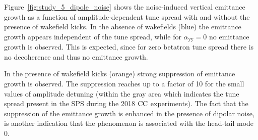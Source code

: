 Figure~\ref{fig:study_5_dipole_noise} shows the noise-induced vertical emittance growth as a function of amplitude-dependent tune spread with and without the presence of wakefield kicks. In the absence of wakefields (blue) the emittance growth appears independent of the tune spread, while for $\alpha_\mathrm{yy}=0$ no emittance growth is observed. This is expected, since for zero betatron tune spread there is no decoherence and thus no emittance growth.
 




In the presence of wakefield kicks (orange) strong suppression of emittance growth is observed. The suppression reaches up to a factor of 10 for the small values of amplitude detuning (within the gray area which indicates the tune spread present in the SPS during the 2018 ${\mathrm{CC}}$ experiments). The fact that the suppression of the emittance growth is enhanced in the presence of dipolar noise, is another indication that the phenomenon is associated with the head-tail mode 0.

